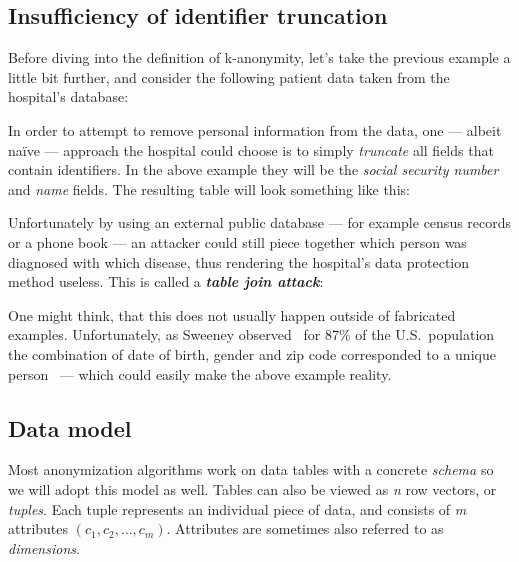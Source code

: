 \subsection{Insufficiency of identifier truncation}\label{subsec:insuff}

Before diving into the definition of k-anonymity, let's take the previous example a little bit further, and consider the following patient data taken from the hospital's database:



In order to attempt to remove personal information from the data, one --- albeit naïve --- approach the hospital could choose is to simply \textit{truncate} all fields that contain identifiers.
In the above example they will be the \textit{social security number} and \textit{name} fields.
The resulting table will look something like this:



Unfortunately by using an external public database --- for example census records or a phone book --- an attacker could still piece together which person was diagnosed with which disease, thus rendering the hospital's data protection method useless.
This is called a \textbf{\textit{table join attack}}:





One might think, that this does not usually happen outside of fabricated examples.
Unfortunately, as Sweeney observed~\cite{sweeney} for 87\% of the U.S.\ population the combination of date of birth, gender and zip code corresponded to a unique person~\cite{aggarwal} --- which could easily make the above example reality.

\subsection{Data model}\label{subsec:data_model}

Most anonymization algorithms work on data tables with a concrete \textit{schema} so we will adopt this model as well.
Tables can also be viewed as \textit{n} row vectors, or \textit{tuples}.
Each tuple represents an individual piece of data, and consists of \textit{m} attributes \((c_1, c_2, \ldots, c_m)\).
Attributes are sometimes also referred to as \textit{dimensions}.

